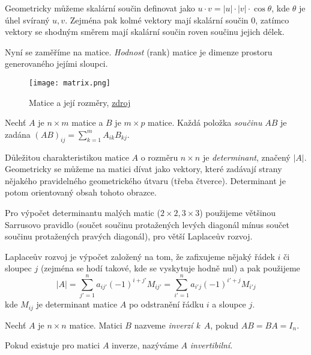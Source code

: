 Geometricky můžeme skalární součin definovat jako
$u \cdot v = \lvert u \rvert \cdot \lvert v \rvert \cdot \cos \theta$,
kde $\theta$ je úhel svíraný $u,v$. Zejména pak kolmé
vektory mají skalární součin 0, zatímco vektory se shodným směrem
mají skalární součin roven součinu jejich délek.



Nyní se zaměříme na matice. {\em Hodnost} (rank) matice je dimenze
prostoru generovaného jejími sloupci.

\begin{figure}[h]
    \centering
    \texttt{[image: matrix.png]}
    \caption{Matice a její rozměry, \href{https://commons.wikimedia.org/wiki/File:Matrix.svg}{zdroj}}
\end{figure}


\begin{definition}
    Nechť $A$ je $n \times m$ matice a $B$ je $m \times p$ matice.
    Každá položka {\em součinu} $AB$ je zadána
    $(AB)_{ij} = \sum^{m}_{k = 1} A_{ik} B_{kj}$.
\end{definition}


Důležitou charakteristikou matice $A$ o rozměru $n \times n$ je {\em
determinant}, značený $\lvert A \rvert$. Geometricky se můžeme na matici
dívat jako vektory, které zadávají strany nějakého pravidelného
geometrického útvaru (třeba čtverce). Determinant je potom orientovaný
obsah tohoto obrazce.

Pro výpočet determinantu malých matic ($2\times2,
3\times3$) použijeme většinou Sarrusovo pravidlo (součet součinu
protažených levých diagonál mínus součet součinu protažených pravých
diagonál), pro větší
Laplaceův rozvoj.

Laplaceův rozvoj je výpočet založený na tom, že zafixujeme nějaký řádek
$i$ či sloupec $j$ (zejména se hodí takové, kde se vyskytuje hodně nul)
a pak použijeme
\[
    \lvert A \rvert
    = \sum_{j' = 1}^{n} a_{ij'} (-1)^{i + j'} M_{ij'}
    = \sum_{i' = 1}^{n} a_{i'j} (-1)^{i' + j} M_{i'j}
\]
kde $M_{ij}$ je determinant matice $A$ po odstranění řádku $i$ a sloupce
$j$.


\begin{definition}
    Nechť $A$ je $n \times n$ matice. Matici $B$ nazveme
    {\em inverzí k}~$A$, pokud $AB = BA = I_n$.

    Pokud existuje pro matici $A$ inverze, nazýváme $A$
    {\em invertibilní}.
\end{definition}


